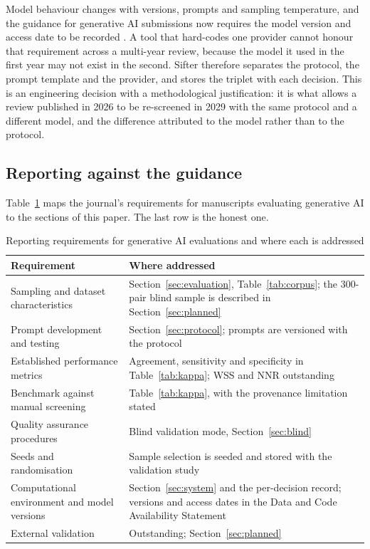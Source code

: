 Model behaviour changes with versions, prompts and sampling temperature, and
the guidance for generative AI submissions now requires the model version and
access date to be recorded \autocite{Farotimi_2025}. A tool that hard-codes one
provider cannot honour that requirement across a multi-year review, because
the model it used in the first year may not exist in the second. Sifter
therefore separates the protocol, the prompt template and the provider, and
stores the triplet with each decision. This is an engineering decision with a
methodological justification: it is what allows a review published in 2026 to
be re-screened in 2029 with the same protocol and a different model, and the
difference attributed to the model rather than to the protocol.

\subsection{Reporting against the guidance}

Table~\ref{tab:guidance} maps the journal's requirements for manuscripts
evaluating generative AI \autocite{Farotimi_2025} to the sections of this
paper. The last row is the honest one.

\begin{table}[htbp]
\centering
\caption{Reporting requirements for generative AI evaluations and where each is
addressed}
\label{tab:guidance}
\begin{tabular}{@{}p{}p{}@{}}
\toprule
Requirement & Where addressed \\
\midrule
Sampling and dataset characteristics &
Section~\ref{sec:evaluation}, Table~\ref{tab:corpus}; the 300-pair blind sample
is described in Section~\ref{sec:planned} \\
Prompt development and testing &
Section~\ref{sec:protocol}; prompts are versioned with the protocol \\
Established performance metrics &
Agreement, sensitivity and specificity in Table~\ref{tab:kappa}; WSS and NNR
outstanding \\
Benchmark against manual screening &
Table~\ref{tab:kappa}, with the provenance limitation stated \\
Quality assurance procedures &
Blind validation mode, Section~\ref{sec:blind} \\
Seeds and randomisation &
Sample selection is seeded and stored with the validation study \\
Computational environment and model versions &
Section~\ref{sec:system} and the per-decision record; versions and access dates
in the Data and Code Availability Statement \\
External validation &
Outstanding; Section~\ref{sec:planned} \\
\bottomrule
\end{tabular}
\end{table}

